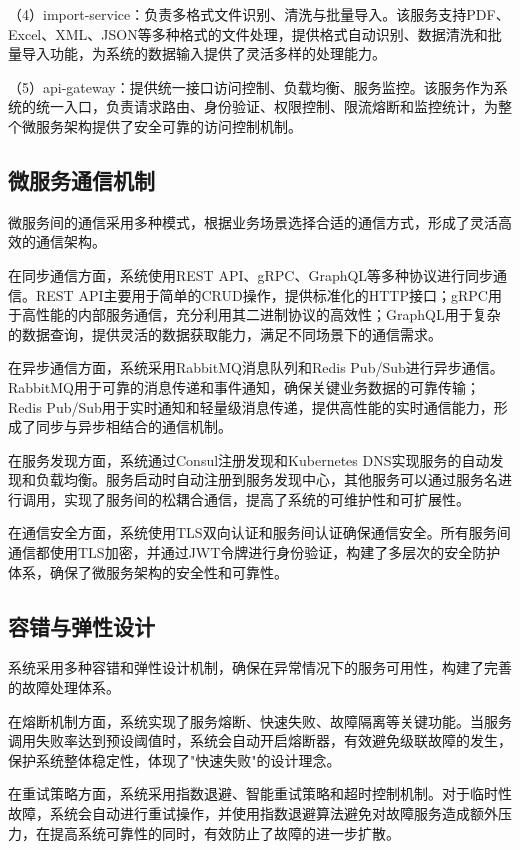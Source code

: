 （4）import-service：负责多格式文件识别、清洗与批量导入。该服务支持PDF、Excel、XML、JSON等多种格式的文件处理，提供格式自动识别、数据清洗和批量导入功能，为系统的数据输入提供了灵活多样的处理能力。

（5）api-gateway：提供统一接口访问控制、负载均衡、服务监控。该服务作为系统的统一入口，负责请求路由、身份验证、权限控制、限流熔断和监控统计，为整个微服务架构提供了安全可靠的访问控制机制。

\subsection{微服务通信机制}

微服务间的通信采用多种模式，根据业务场景选择合适的通信方式，形成了灵活高效的通信架构。

在同步通信方面，系统使用REST API、gRPC、GraphQL等多种协议进行同步通信。REST API主要用于简单的CRUD操作，提供标准化的HTTP接口；gRPC用于高性能的内部服务通信，充分利用其二进制协议的高效性；GraphQL用于复杂的数据查询，提供灵活的数据获取能力，满足不同场景下的通信需求。

在异步通信方面，系统采用RabbitMQ消息队列和Redis Pub/Sub进行异步通信。RabbitMQ用于可靠的消息传递和事件通知，确保关键业务数据的可靠传输；Redis Pub/Sub用于实时通知和轻量级消息传递，提供高性能的实时通信能力，形成了同步与异步相结合的通信机制。

在服务发现方面，系统通过Consul注册发现和Kubernetes DNS实现服务的自动发现和负载均衡。服务启动时自动注册到服务发现中心，其他服务可以通过服务名进行调用，实现了服务间的松耦合通信，提高了系统的可维护性和可扩展性。

在通信安全方面，系统使用TLS双向认证和服务间认证确保通信安全。所有服务间通信都使用TLS加密，并通过JWT令牌进行身份验证，构建了多层次的安全防护体系，确保了微服务架构的安全性和可靠性。

\subsection{容错与弹性设计}

系统采用多种容错和弹性设计机制，确保在异常情况下的服务可用性，构建了完善的故障处理体系。

在熔断机制方面，系统实现了服务熔断、快速失败、故障隔离等关键功能。当服务调用失败率达到预设阈值时，系统会自动开启熔断器，有效避免级联故障的发生，保护系统整体稳定性，体现了"快速失败"的设计理念。

在重试策略方面，系统采用指数退避、智能重试策略和超时控制机制。对于临时性故障，系统会自动进行重试操作，并使用指数退避算法避免对故障服务造成额外压力，在提高系统可靠性的同时，有效防止了故障的进一步扩散。


